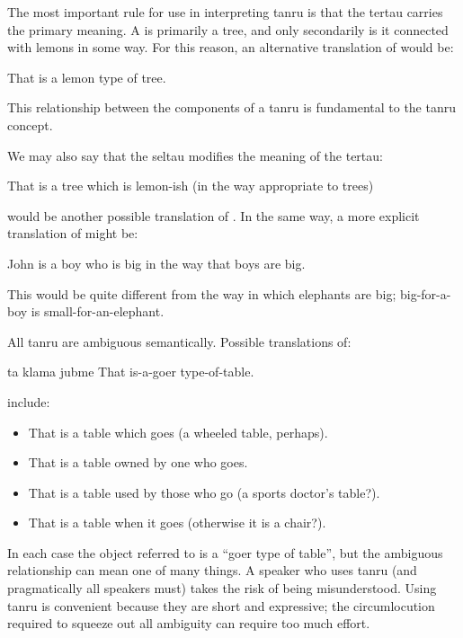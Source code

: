 The most important rule for use in interpreting tanru is
    that the tertau carries the primary meaning. A  is primarily a tree, and only secondarily is it
    connected with lemons in some way. For this reason, an
    alternative translation of 
    would be:
\begin{example}
That is a lemon type of tree.
\end{example}

This  relationship between the components of a
    tanru is fundamental to the tanru concept.

We may also say that the seltau modifies the meaning of the
    tertau:
\begin{example}
That is a tree which is lemon-ish (in the way appropriate to trees)
\end{example}

{\noindent}would be another possible translation of . In the same way, a more explicit
    translation of  might be:
\begin{example}
John is a boy who is big in the way that boys are big.
\end{example}

This  would be quite different from
    the way in which elephants are big; big-for-a-boy is
    small-for-an-elephant.

All tanru are ambiguous semantically. Possible translations
    of:
\begin{example}
ta klama jubme\n
That is-a-goer type-of-table.
\end{example}

{\noindent}include: 
\begin{itemize}
\item That is a table which goes (a wheeled table, perhaps).
\item That is a table owned by one who goes.
\item That is a table used by those who go (a sports doctor's table?).
\item That is a table when it goes (otherwise it is a chair?).
\end{itemize}

In each case the object referred to is a ``goer type of
    table'', but the ambiguous  relationship can mean
    one of many things. A speaker who uses tanru (and pragmatically
    all speakers must) takes the risk of being misunderstood. Using
    tanru is convenient because they are short and expressive; the
    circumlocution required to squeeze out all ambiguity can
    require too much effort. 

